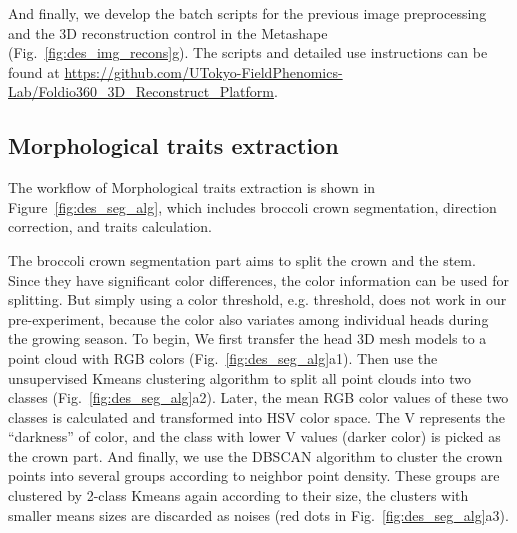 And finally, we develop the batch scripts for the previous image preprocessing and the 3D reconstruction control in the Metashape (Fig.~\ref{fig:des_img_recons}g). The scripts and detailed use instructions can be found at \url{https://github.com/UTokyo-FieldPhenomics-Lab/Foldio360_3D_Reconstruct_Platform}.

\subsection{Morphological traits extraction}

The workflow of Morphological traits extraction is shown in Figure~\ref{fig:des_seg_alg}, which includes broccoli crown segmentation, direction correction, and traits calculation.



The broccoli crown segmentation part aims to split the crown and the stem. Since they have significant color differences, the color information can be used for splitting. But simply using a color threshold, e.g. \citet{otsu_threshold_1979} threshold, does not work in our pre-experiment, because the color also variates among individual heads during the growing season. To begin, We first transfer the head 3D mesh models to a point cloud with RGB colors (Fig.~\ref{fig:des_seg_alg}a1). Then use the unsupervised Kmeans clustering algorithm to split all point clouds into two classes (Fig.~\ref{fig:des_seg_alg}a2). Later, the mean RGB color values of these two classes is calculated and transformed into HSV color space. The V represents the ``darkness'' of color, and the class with lower V values (darker color) is picked as the crown part. And finally, we use the DBSCAN algorithm to cluster the crown points into several groups according to neighbor point density. These groups are clustered by 2-class Kmeans again according to their size, the clusters with smaller means sizes are discarded as noises (red dots in Fig.~\ref{fig:des_seg_alg}a3).

